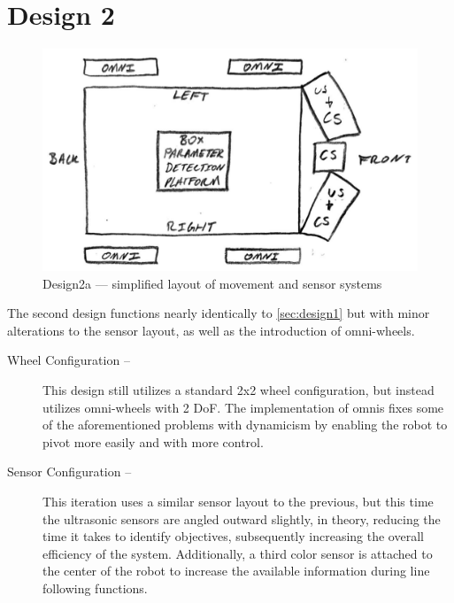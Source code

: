 \documentclass[11pt]{report}
\begin{document}
\newpage
\section{Design 2}\label{sec:design2}
\begin{figure}[H]
    \centering
    \hspace*{2em}
    \includegraphics[width=0.5\linewidth]{Images//Designs/Design2a.pdf}
    \caption{Design2a --- simplified layout of movement and sensor systems}
    \label{fig:design2a}
\end{figure}
The second design functions nearly identically to \cref{sec:design1} but with minor alterations to the sensor layout, as well as the introduction of \gls{omni}-wheels.

\begin{description}
    \item[Wheel Configuration --] This design still utilizes a standard 2x2 wheel configuration, but instead utilizes \gls{omni}-wheels with 2 \gls{DoF}. The implementation of \glspl{omni} fixes some of the aforementioned problems with dynamicism by enabling the robot to pivot more easily and with more control.
    \item[Sensor Configuration --] This iteration uses a similar sensor layout to the previous, but this time the ultrasonic sensors are angled outward slightly, in theory, reducing the time it takes to identify objectives, subsequently increasing the overall efficiency of the system. Additionally, a third color sensor is attached to the center of the robot to increase the available information during line following functions.
\end{description}
\end{document}
